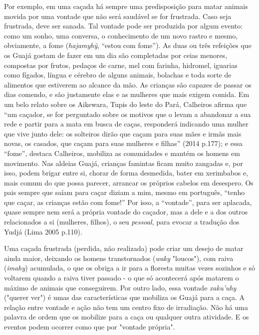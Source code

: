 Por exemplo, em uma caçada há sempre uma predisposição para matar
animais movida por uma vontade que não será saudável se for frustrada.
Caso seja frustrada, deve ser sanada. Tal vontade pode ser produzida por
algum evento: como um sonho, uma conversa, o conhecimento de um novo
rastro e mesmo, obviamente, a fome (\emph{hajamyhỹ}, ``estou com
fome''). As duas ou três refeições que os Guajá gostam de fazer em um
dia são completadas por ceias menores, compostas por frutos, pedaços de
carne, mel com farinha, hidromel, iguarias como fígados, língua e
cérebro de alguns animais, bolachas e toda sorte de alimentos que
estiverem ao alcance da mão. As crianças são capazes de passar os dias
comendo, e são justamente elas e as mulheres que mais exigem comida. Em
um belo relato sobre os Aikewara, Tupis do leste do Pará, Calheiros
afirma que ``um caçador, se for perguntado sobre os motivos que o levam
a abandonar a sua rede e partir para a mata em busca de caças,
responderá indicando uma mulher que vive junto dele: os solteiros dirão
que caçam para suas mães e irmãs mais novas, os casados, que caçam para
suas mulheres e filhas'' (2014 p.177); e essa ``fome'', destaca
Calheiros, mobiliza as comunidades e mantém os homens em movimento. Nas
aldeias Guajá, crianças famintas ficam muito zangadas e, por isso, podem
brigar entre si, chorar de forma desmedida, bater em xerimbabos e, mais
comum do que possa parecer, arrancar os próprios cabelos em desespero.
Os pais sempre que saíam para caçar diziam a mim, mesmo em português,
``tenho que caçar, as crianças estão com fome!'' Por isso, a
``vontade'', para ser aplacada, quase sempre nem será a própria vontade
do caçador, mas a dele e a dos outros relacionados a si (mulheres,
filhos), o seu \emph{pessoal}, para evocar a tradução dos Yudjá (Lima
2005 p.110).

Uma caçada frustrada (perdida, não realizada) pode criar um desejo de
matar ainda maior, deixando os homens transtornados (\emph{waky}
"loucos"), com raiva (\emph{imahy}) acumulada, o que os obriga a ir para
a floresta muitas vezes sozinhos e só voltarem quando a raiva tiver
passado - o que só acontecerá após matarem o máximo de animais que
conseguirem. Por outro lado, essa vontade \emph{xaku'uhy} ("querer ver")
é umas das características que mobiliza os Guajá para a caça. A relação
entre vontade e ação não tem um centro fixo de irradiação. Não há uma
palavra de ordem que os mobilize para a caça ou qualquer outra
atividade. E os eventos podem ocorrer como que por "vontade própria".

